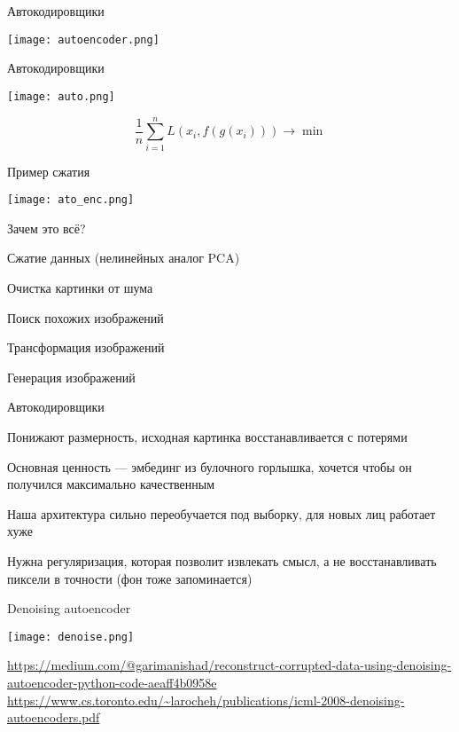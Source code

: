 \documentclass[notes,12pt, aspectratio=169]{beamer}
\newenvironment{wideitemize}{\itemize\addtolength{\itemsep}{10pt}}{\enditemize}
\begin{document}
\begin{frame}{Автокодировщики}
	\begin{center}
		\texttt{[image: autoencoder.png]}
	\end{center}
\end{frame}


\begin{frame}{Автокодировщики}
	\begin{center}
		\texttt{[image: auto.png]}
	\end{center} \pause
	\[
	\frac{1}{n} \sum_{i=1}^n L(x_i, f(g(x_i))) \to \min 
	\]
\end{frame}


\begin{frame}{Пример сжатия}
	\begin{center}
		\texttt{[image: ato\_enc.png]}
	\end{center}
\end{frame}

\begin{frame}{Зачем это всё?}
	\begin{wideitemize}
		\item  Сжатие данных (нелинейных аналог PCA)
		\item  Очистка картинки от шума
		\item  Поиск похожих изображений
		\item  Трансформация изображений
		\item  Генерация изображений
	\end{wideitemize}
\end{frame}


\begin{frame}{Автокодировщики}
	\begin{wideitemize}
		\item  Понижают размерность, исходная картинка восстанавливается с потерями
		\item  Основная ценность — эмбединг из булочного горлышка, хочется чтобы он получился максимально качественным
		\item  Наша архитектура сильно переобучается под выборку, для новых лиц работает хуже
		\item  Нужна регуляризация, которая позволит извлекать смысл, а не восстанавливать пиксели в точности (фон тоже запоминается)
	\end{wideitemize}
\end{frame}


\begin{frame}{Denoising autoencoder}
	\begin{center}
		\texttt{[image: denoise.png]}
	\end{center}
	\vfill
	\footnotesize
	{\color{blue} \url{https://medium.com/@garimanishad/reconstruct-corrupted-data-using-denoising-autoencoder-python-code-aeaff4b0958e} \newline \url{https://www.cs.toronto.edu/~larocheh/publications/icml-2008-denoising-autoencoders.pdf} } 
\end{frame}
\end{document}
